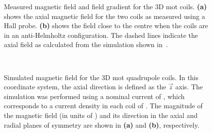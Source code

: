 \begin{figure}[!htbp]
	\centering
	\def\svgwidth{\columnwidth}
	\label{fig:mot_coil_plots}
	\label{fig:mot_coil_plots_together}
	\caption[Measured magnetic field and field gradient for the 3D \ac{mot}
		coils]{Measured magnetic field and field gradient for the 3D \ac{mot}
		coils. \textbf{(a)} shows the axial magnetic field for the two coils as
		measured using a Hall probe. \textbf{(b)} shows the field close to the centre when the coils are in an anti-Helmholtz configuration. The dashed lines indicate the axial field as
		calculated from the simulation shown
		in~.}
	
\end{figure}
\begin{figure}[!htbp]
	\centering
	\def\svgwidth{\columnwidth}
	\\
	\caption[Simulated magnetic field for the 3D \ac{mot} quadrupole
		coils]{Simulated magnetic field for the 3D \ac{mot} quadrupole coils. In
		this coordinate system, the axial direction is defined as the
		\(\vec{z}\) axis. The simulation was performed using a nominal current
		of , which corresponds to a current density in
		each coil of . The
		magnitude of the magnetic field (in units of \sivalue{}{\gauss}) and its
		direction in the axial and radial planes of symmetry are shown in
		\textbf{(a)} and
		\textbf{(b)}, respectively.}
	\label{fig:3D_mot_field_sim}
\end{figure}
